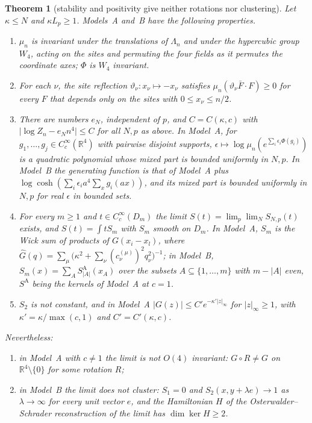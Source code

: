 \documentclass[11pt,a4paper]{amsart}
\newtheorem{theorem}{Theorem}[section]
\theoremstyle{definition}
\theoremstyle{remark}
\numberwithin{equation}{section}
\newcommand{\R}{\mathbb{R}}          %
\newcommand{\abs}[1]{\lvert #1\rvert}      %
\newcommand{\Lp}{L_p}                      %
\begin{document}
\begin{theorem}[stability and positivity give neither rotations nor clustering]\label{thm:non-implication}
Let $\kappa\le N$ and $\kappa\Lp\ge1$. Models~A and~B have the following properties.
\begin{enumerate}[label=\textup{(\roman*)},leftmargin=*]
\item $\mu_n$ is invariant under the translations of $\Lambda_n$ and under the hypercubic group $W_4$, acting on the sites and permuting the four fields as it permutes the coordinate axes; $\Phi$ is $W_4$ invariant.
\item For each $\nu$, the site reflection $\vartheta_\nu\colon x_\nu\mapsto-x_\nu$ satisfies $\mu_n(\vartheta_\nu\bar F\cdot F)\ge0$ for every $F$ that depends only on the sites with $0\le x_\nu\le n/2$.
\item There are numbers $e_N$, independent of $p$, and $C=C(\kappa,c)$ with $\abs{\log Z_n-e_Nn^4}\le C$ for all $N,p$ as above. In Model~A, for $g_1,\dots,g_j\in C^\infty_c(\R^4)$ with pairwise disjoint supports, $\epsilon\mapsto\log\mu_n(e^{\sum_i\epsilon_i\Phi(g_i)})$ is a quadratic polynomial whose mixed part is bounded uniformly in $N,p$. In Model~B the generating function is that of Model~A plus $\log\cosh(\sum_i\epsilon_ia^4\sum_xg_i(ax))$, and its mixed part is bounded uniformly in $N,p$ for real $\epsilon$ in bounded sets.
\item For every $m\ge1$ and $t\in C^\infty_c(D_m)$ the limit $S(t)=\lim_p\lim_NS_{N,p}(t)$ exists, and $S(t)=\int tS_m$ with $S_m$ smooth on $D_m$. In Model~A, $S_m$ is the Wick sum of products of $G(x_i-x_l)$, where $\hat G(q)=\sum_\mu\bigl(\kappa^2+\sum_\nu(c^{(\mu)}_\nu)^2q_\nu^2\bigr)^{-1}$; in Model~B, $S_m(x)=\sum_AS^{\mathrm A}_{\abs A}(x_A)$ over the subsets $A\subseteq\{1,\dots,m\}$ with $m-\abs A$ even, $S^{\mathrm A}$ being the kernels of Model~A at $c=1$.
\item $S_2$ is not constant, and in Model~A $\abs{G(z)}\le C'e^{-\kappa'\abs z_\infty}$ for $\abs z_\infty\ge1$, with $\kappa'=\kappa/\max(c,1)$ and $C'=C'(\kappa,c)$.
\end{enumerate}
Nevertheless:
\begin{enumerate}[label=\textup{(\Alph*)},leftmargin=*]
\item in Model~A with $c\ne1$ the limit is not $O(4)$ invariant: $G\circ R\ne G$ on $\R^4\setminus\{0\}$ for some rotation $R$;
\item in Model~B the limit does not cluster: $S_1=0$ and $S_2(x,y+\lambda e)\to1$ as $\lambda\to\infty$ for every unit vector $e$, and the Hamiltonian $H$ of the Osterwalder--Schrader reconstruction of the limit has $\dim\ker H\ge2$.
\end{enumerate}
\end{theorem}
\end{document}
